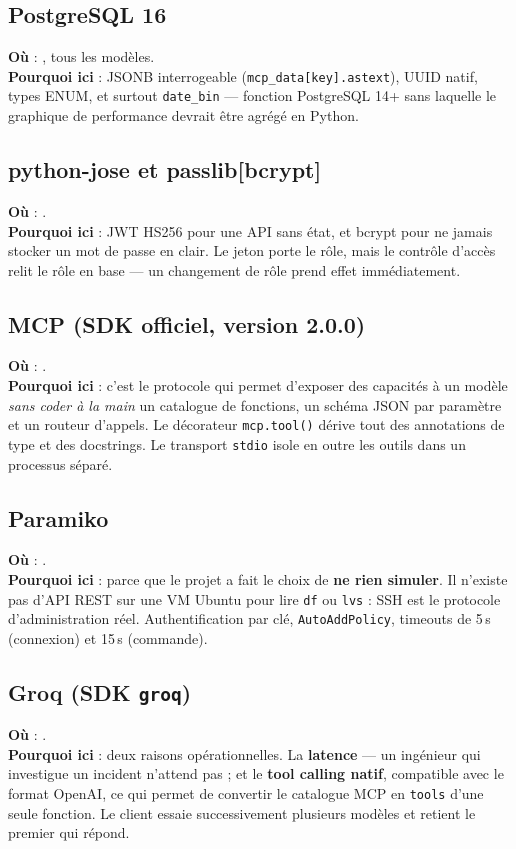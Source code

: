 \subsection{PostgreSQL 16}
\textbf{Où} : , tous les modèles.\\
\textbf{Pourquoi ici} : JSONB interrogeable (\texttt{mcp\_data[key].astext}),
UUID natif, types ENUM, et surtout \texttt{date\_bin} --- fonction PostgreSQL
14+ sans laquelle le graphique de performance devrait être agrégé en Python.

\subsection{python-jose et passlib[bcrypt]}
\textbf{Où} : .\\
\textbf{Pourquoi ici} : JWT HS256 pour une API sans état, et bcrypt pour ne
jamais stocker un mot de passe en clair. Le jeton porte le rôle, mais le contrôle
d'accès relit le rôle en base --- un changement de rôle prend effet
immédiatement.

\subsection{MCP (SDK officiel, version 2.0.0)}
\textbf{Où} : .\\
\textbf{Pourquoi ici} : c'est le protocole qui permet d'exposer des capacités à
un modèle \emph{sans coder à la main} un catalogue de fonctions, un schéma JSON
par paramètre et un routeur d'appels. Le décorateur \texttt{mcp.tool()} dérive
tout des annotations de type et des docstrings. Le transport \texttt{stdio}
isole en outre les outils dans un processus séparé.

\subsection{Paramiko}
\textbf{Où} : .\\
\textbf{Pourquoi ici} : parce que le projet a fait le choix de \textbf{ne rien
simuler}. Il n'existe pas d'API REST sur une VM Ubuntu pour lire \texttt{df} ou
\texttt{lvs} : SSH est le protocole d'administration réel. Authentification par
clé, \texttt{AutoAddPolicy}, timeouts de 5\,s (connexion) et 15\,s (commande).

\subsection{Groq (SDK \texttt{groq})}
\textbf{Où} : .\\
\textbf{Pourquoi ici} : deux raisons opérationnelles. La \textbf{latence} ---
un ingénieur qui investigue un incident n'attend pas ; et le \textbf{tool
calling natif}, compatible avec le format OpenAI, ce qui permet de convertir le
catalogue MCP en \texttt{tools} d'une seule fonction. Le client essaie
successivement plusieurs modèles et retient le premier qui répond.

